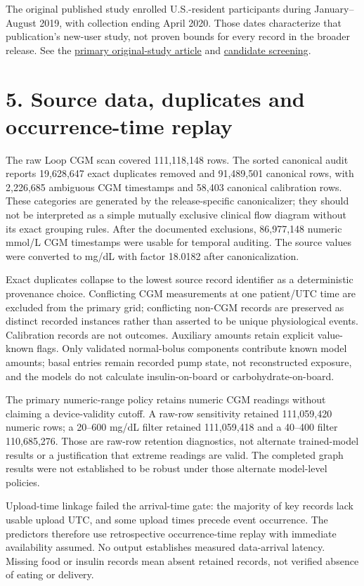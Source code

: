 \documentclass[11pt,a4paper]{article}
\begin{document}
The original published study enrolled U.S.-resident participants during January--August 2019, with collection ending April 2020. Those dates characterize that publication's new-user study, not proven bounds for every record in the broader release. See the \href{https://journals.sagepub.com/doi/full/10.1089/dia.2020.0535}{primary original-study article} and \href{jaeb_candidate_screening.md}{candidate screening}.

\section*{5. Source data, duplicates and occurrence-time replay}
The raw Loop CGM scan covered 111,118,148 rows. The sorted canonical audit reports 19,628,647 exact duplicates removed and 91,489,501 canonical rows, with 2,226,685 ambiguous CGM timestamps and 58,403 canonical calibration rows. These categories are generated by the release-specific canonicalizer; they should not be interpreted as a simple mutually exclusive clinical flow diagram without its exact grouping rules. After the documented exclusions, 86,977,148 numeric mmol/L CGM timestamps were usable for temporal auditing. The source values were converted to mg/dL with factor 18.0182 after canonicalization.

Exact duplicates collapse to the lowest source record identifier as a deterministic provenance choice. Conflicting CGM measurements at one patient/UTC time are excluded from the primary grid; conflicting non-CGM records are preserved as distinct recorded instances rather than asserted to be unique physiological events. Calibration records are not outcomes. Auxiliary amounts retain explicit value-known flags. Only validated normal-bolus components contribute known model amounts; basal entries remain recorded pump state, not reconstructed exposure, and the models do not calculate insulin-on-board or carbohydrate-on-board.

The primary numeric-range policy retains numeric CGM readings without claiming a device-validity cutoff. A raw-row sensitivity retained 111,059,420 numeric rows; a 20--600 mg/dL filter retained 111,059,418 and a 40--400 filter 110,685,276. Those are raw-row retention diagnostics, not alternate trained-model results or a justification that extreme readings are valid. The completed graph results were not established to be robust under those alternate model-level policies.

Upload-time linkage failed the arrival-time gate: the majority of key records lack usable upload UTC, and some upload times precede event occurrence. The predictors therefore use retrospective occurrence-time replay with immediate availability assumed. No output establishes measured data-arrival latency. Missing food or insulin records mean absent retained records, not verified absence of eating or delivery.
\end{document}
